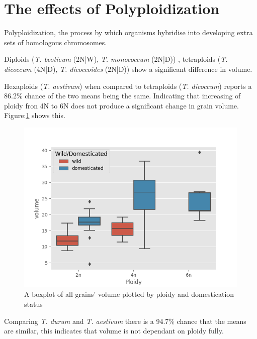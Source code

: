 \documentclass[11pt]{report}
\begin{document}
\section{The effects of Polyploidization}
\label{sec:orgf00c742}

Polyploidization, the process by which organisms hybridise into developing extra sets of homologous chromosomes.

Diploids (\emph{T. beoticum} (2N|W), \emph{T. monococcum} (2N|D)) , tetraploids (\emph{T. dicoccum} (4N|D), \emph{T. dicoccoides} (2N|D)) show a significant difference in volume.

Hexaploids (\emph{T. aestivum}) when compared to tetraploids (\emph{T. dicoccum}) reports a 86.2\% chance of the two means being the same. Indicating that increasing of ploidy fron 4N to 6N does not produce a significant change in grain volume. Figure:\ref{fig:org94fbaf7} shows this.

\begin{figure}[htbp]
\centering
\includegraphics[width=12cm]{./images/results/ploidyvol.png}
\caption{\label{fig:org94fbaf7}
A boxplot of all grains' volume plotted by ploidy and domestication status}
\end{figure}

\clearpage
Comparing \emph{T. durum} and \emph{T. aestivum} there is a 94.7\% chance that the means are similar, this indicates that volume is not dependant on ploidy fully.
\end{document}
